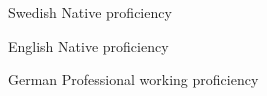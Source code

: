 
\begin{cvskills}

  \cvskill
    {Swedish} %
    {Native proficiency} %

  \cvskill
    {English} %
    {Native proficiency} %
    
\cvskill
    {German} %
    {Professional working proficiency} %

    
\end{cvskills}
